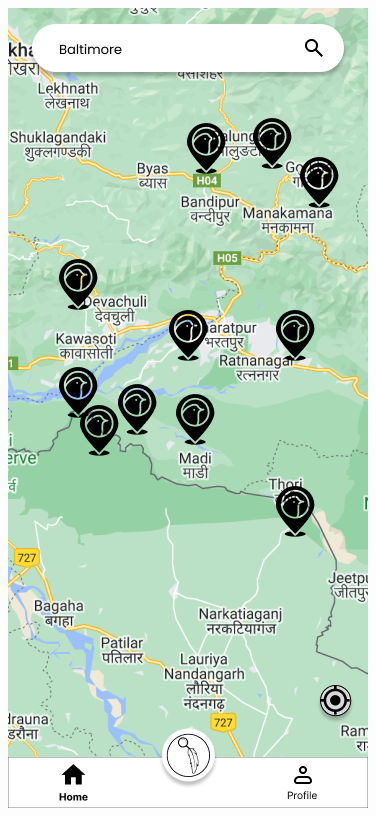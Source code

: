 \begin{figure}[h!]
    \centering
    \begin{minipage}[b]{0.4\linewidth}
        \includegraphics[width=\linewidth]{images/homepage.png}

\end{minipage}
\end{figure}
